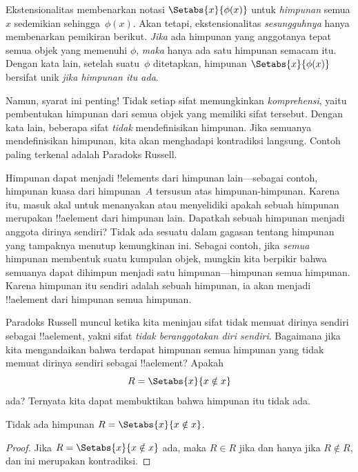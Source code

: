 \documentclass[../../../include/open-logic-section]{subfiles}
\begin{document}

Ekstensionalitas membenarkan notasi $\Setabs{x}{\phi(x)}$ untuk
\emph{himpunan} semua $x$ sedemikian sehingga~$\phi(x)$. Akan tetapi,
ekstensionalitas \emph{sesungguhnya} hanya membenarkan pemikiran berikut.
\emph{Jika} ada himpunan yang anggotanya tepat semua objek yang
memenuhi $\phi$, \emph{maka} hanya ada satu himpunan semacam itu.
Dengan kata lain, setelah suatu~$\phi$ ditetapkan, himpunan
$\Setabs{x}{\phi(x)}$ bersifat unik \emph{jika himpunan itu ada}.

Namun, syarat ini penting!{} Tidak setiap sifat memungkinkan
\emph{komprehensi}, yaitu pembentukan himpunan dari semua objek yang
memiliki sifat tersebut. Dengan kata lain, beberapa sifat
\emph{tidak} mendefinisikan himpunan. Jika semuanya mendefinisikan
himpunan, kita akan menghadapi kontradiksi langsung. Contoh paling
terkenal adalah Paradoks Russell.

Himpunan dapat menjadi !!{element}s dari himpunan lain---sebagai
contoh, himpunan kuasa dari himpunan~$A$ tersusun atas himpunan-himpunan.
Karena itu, masuk akal untuk menanyakan atau menyelidiki apakah sebuah
himpunan merupakan !!a{element} dari himpunan lain. Dapatkah sebuah
himpunan menjadi anggota dirinya sendiri? Tidak ada sesuatu dalam
gagasan tentang himpunan yang tampaknya menutup kemungkinan ini.
Sebagai contoh, jika \emph{semua} himpunan membentuk suatu kumpulan
objek, mungkin kita berpikir bahwa semuanya dapat dihimpun menjadi
satu himpunan---himpunan semua himpunan. Karena himpunan itu sendiri
adalah sebuah himpunan, ia akan menjadi !!a{element} dari himpunan
semua himpunan.

Paradoks Russell muncul ketika kita meninjau sifat tidak memuat dirinya
sendiri sebagai !!a{element}, yakni sifat \emph{tidak beranggotakan
diri sendiri}. Bagaimana jika kita mengandaikan bahwa terdapat
himpunan semua himpunan yang tidak memuat dirinya sendiri sebagai
!!a{element}? Apakah
\[
R = \Setabs{x}{x \notin x}
\]
ada? Ternyata kita dapat membuktikan bahwa himpunan itu tidak ada.

\begin{thm}
	Tidak ada himpunan $R = \Setabs{x}{x \notin x}$.
\end{thm}

\begin{proof}
Jika $R = \Setabs{x}{x \notin x}$ ada, maka
$R \in R$ jika dan hanya jika $R \notin R$, dan ini merupakan
kontradiksi.
\end{proof}
\end{document}
